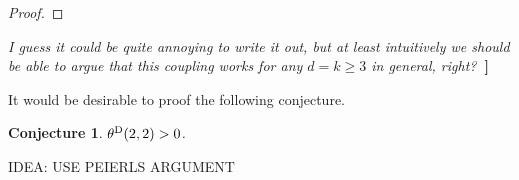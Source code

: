 \documentclass{article}
\newtheorem{conj}[theorem]{Conjecture}
\theoremstyle{definition}
\renewcommand{\P}{\mathbb{P}}
\newcommand{\1}{\mathbbm{1}}
\newcommand{\E}{\mathbb{E}}
\newcommand{\0}{\mathbf{o}}
\renewcommand{\d}{\mathrm{d}}
\newcommand{\Z}{\mathbb{Z}}
\newcommand{\basc}[1]{{\color{blue}{ \bf [~Bas:\ }\emph{#1}\textbf{~]}}}
\begin{document}
\begin{proof}
\end{proof}
\basc{I guess it could be quite annoying to write it out, but at least intuitively  we should be able to argue that this coupling works for any $d=k\geq 3$ in general, right?}



It would be desirable to proof the following conjecture.
\begin{conj}
$\theta^{\rm D}(2,2)>0$. 
\end{conj}
IDEA: USE PEIERLS ARGUMENT
\end{document}
